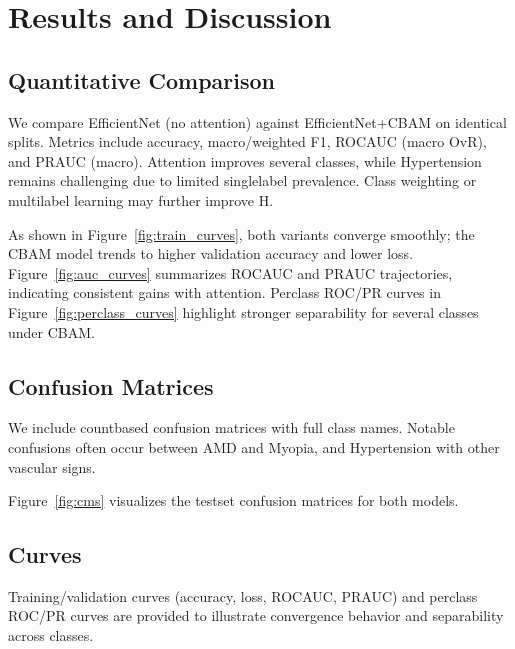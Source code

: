 \chapter{Results and Discussion}\label{sec:results}
\section{Quantitative Comparison}
We compare EfficientNet (no attention) against EfficientNet+CBAM on identical splits. Metrics include accuracy, macro/weighted F1, ROC\textendash AUC (macro OvR), and PR\textendash AUC (macro). Attention improves several classes, while Hypertension remains challenging due to limited single\textendash label prevalence. Class weighting or multi\textendash label learning may further improve H.

As shown in Figure~\ref{fig:train_curves}, both variants converge smoothly; the CBAM model trends to higher validation accuracy and lower loss. Figure~\ref{fig:auc_curves} summarizes ROC\textendash AUC and PR\textendash AUC trajectories, indicating consistent gains with attention. Per\textendash class ROC/PR curves in Figure~\ref{fig:perclass_curves} highlight stronger separability for several classes under CBAM.

\section{Confusion Matrices}
We include count\textendash based confusion matrices with full class names. Notable confusions often occur between AMD and Myopia, and Hypertension with other vascular signs.

Figure~\ref{fig:cms} visualizes the test\textendash set confusion matrices for both models.

\section{Curves}\label{sec:results_figs}
Training/validation curves (accuracy, loss, ROC\textendash AUC, PR\textendash AUC) and per\textendash class ROC/PR curves are provided to illustrate convergence behavior and separability across classes.

